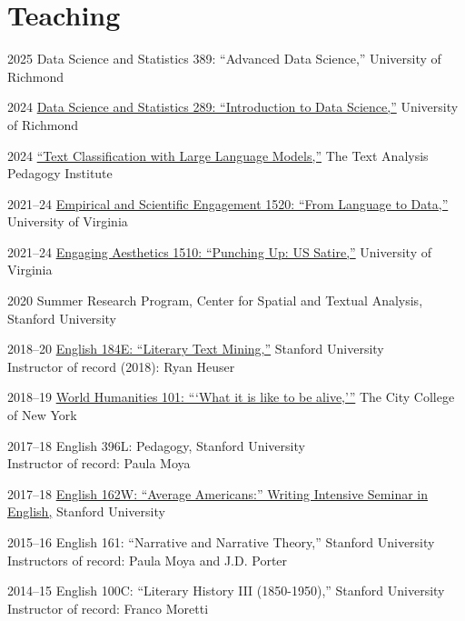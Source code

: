 \documentclass[12pt,letterpaper]{report}
\begin{document}
\section*{Teaching}

\begin{tablist}
	\item[2025] \tab{}Data Science and Statistics 389: \enquote{Advanced Data Science,} University of Richmond
	\item[2024] \tab{}\href{https://fredner.org/teaching/#dsst289}{Data Science and Statistics 289: \enquote{Introduction to Data Science,}} University of Richmond
	\item[2024] \tab{}\href{https://fredner.org/teaching/#llm}{\enquote{Text Classification with Large Language Models,}} The Text Analysis Pedagogy Institute
	\item[2021--24] \tab{}\href{https://fredner.org/teaching/#l2d}{Empirical and Scientific Engagement 1520: \enquote{From Language to Data,}} University of Virginia
	\item[2021--24] \tab{}\href{https://fredner.org/teaching/#satire}{Engaging Aesthetics 1510: \enquote{Punching Up: US Satire,}} University of Virginia
	\item[2020] \tab{}Summer Research Program, Center for Spatial and Textual Analysis, Stanford University
	\item[2018--20] \tab{}\href{https://fredner.org/teaching/#ltm}{English 184E: \enquote{Literary Text Mining,}} Stanford University \\
	Instructor of record (2018): Ryan Heuser
	\item[2018--19] \tab{}\href{https://fredner.org/teaching/#whum}{World Humanities 101: \enquote{\enquote{What it is like to be alive,}}} The City College of New York
	\item[2017--18] \tab{}English 396L: Pedagogy, Stanford University \\
	Instructor of record: Paula Moya
	\item[2017--18] \tab{}\href{https://fredner.org/teaching/#avg}{English 162W: \enquote{Average Americans:} Writing Intensive Seminar in English,} Stanford University
	\item[2015--16] \tab{}English 161: \enquote{Narrative and Narrative Theory,} Stanford University \\
	Instructors of record: Paula Moya and J.D. Porter
	\item[2014--15] \tab{}English 100C: \enquote{Literary History III (1850-1950),} Stanford University \\
	Instructor of record: Franco Moretti
\end{tablist}
\end{document}
